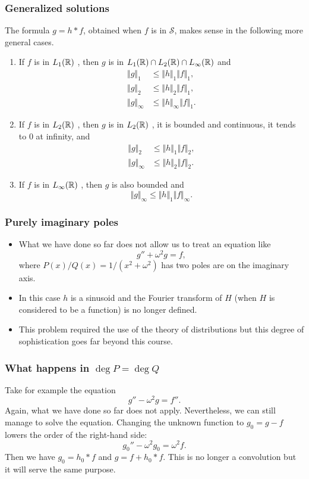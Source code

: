 \begin{frame}
\frametitle{Generalized solutions}
The formula $g=h*f$, obtained when $f$ is in $\mathcal{S}$, makes sense in the following more general cases.
\begin{enumerate}
\item If $f$ is in $L_1(\mathbb{R})$ , then $g$ is in $L_1(\mathbb{R})\cap L_2(\mathbb{R})\cap L_\infty(\mathbb{R})$  and
\begin{align*}
\Vert g\Vert_{1}\ &\leq\Vert h\Vert_{1}\Vert f\Vert_{1}, \\
\Vert g\Vert_{2}\ &\leq\Vert h\Vert_{2}\Vert f\Vert_{1}, \\
\Vert g\Vert_{\infty} &\leq\Vert h\Vert_{\infty}\Vert f\Vert_{1}.
\end{align*}
\item If $f$ is in $L_2(\mathbb{R})$ , then $g$ is in $L_2(\mathbb{R})$ , it is bounded and continuous, it tends to $0$ at infinity, and
\begin{align*}
\Vert g\Vert_{2}\ &\leq\Vert h\Vert_{1}\Vert f\Vert_{2}, \\
\Vert g\Vert_{\infty}& \leq \Vert h\Vert_{2}\Vert f\Vert_{2}.
\end{align*}
\item If $f$ is in $L_\infty(\mathbb{R})$ , then $g$ is also bounded and
$$
\Vert g\Vert_{\infty}\leq\Vert h\Vert_{1}\Vert f\Vert_{\infty}.
$$
\end{enumerate}
\end{frame}


\begin{frame}
\frametitle{Purely imaginary poles}
\begin{itemize}
\item What we have done so far does not allow us to treat an equation like
$$
g''+\omega^{2}g=f,
$$
where $P(x)/Q(x)=1/(x^{2}+\omega^{2})$ has two poles are on the imaginary axis.
\item In this case $h$ is a sinusoid and the Fourier transform of $H$ (when $H$ is considered to be a function) is no longer defined.
\item This problem required the use of the \alert{theory of  distributions} but this degree of sophistication goes far beyond this course.
\end{itemize}
\end{frame}

\begin{frame}
\frametitle{What happens in $\deg P= \deg Q$}
Take for example the equation
$$
g''-\omega^{2}g=f''.
$$
Again, what we have done so far does not apply. Nevertheless, we can still manage to solve the equation.
Changing the unknown function to $g_0 =g-f$ lowers the order of the right-hand side:
$$
g_{0}''-\omega^{2}g_{0}=\omega^{2}f.
$$
Then we have $g_{0}=h_{0}*f$ and $g=f+h_{0}*f$.
This is \alert{no longer a convolution}  but it will serve the same purpose.
\end{frame}



